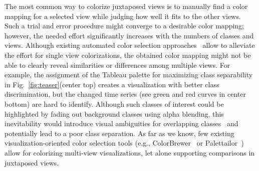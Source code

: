 The most common way to colorize juxtaposed views is to manually find a color mapping for a    selected view while judging how well it fits to the other views. Such a trial and error procedure might converge to a desirable color mapping; however, the needed effort significantly increases with the numbers of classes and views. %
Although existing automated color selection approaches~\cite{Chen14,Wang2018,Lu21} allow to alleviate the effort for single view colorizations, the obtained color mapping might not be able to clearly reveal similarities or differences among multiple views. For example, the assignment of the Tableau palette for maximizing class separability  in Fig.~\ref{fig:teaser}(center top) creates a visualization with better class discrimination, but the changed time series (see green and red curves in center bottom) are hard to identify.
Although such classes of interest could be highlighted by fading out background classes using alpha blending, this  inevitability would introduce visual ambiguities for overlapping classes~\cite{baudisch2004multiblending} and potentially lead to a poor class separation.
As far as we know, few existing visualization-oriented color selection tools (e.g., ColorBrewer~\cite{harrower2003colorbrewer} or Palettailor~\cite{Lu21}) allow for colorizing multi-view visualizations, let alone supporting comparisons in juxtaposed views.



